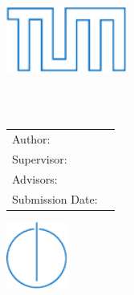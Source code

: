 \begin{titlepage}
  \centering

  \vspace{35mm}
  \includegraphics[width=40mm]{logos/tum}

  \vspace{5mm}
  {\huge\MakeUppercase{\getFaculty{}}}\\

  \vspace{5mm}
  {\large\MakeUppercase{\getUniversity{}}}\\

  \vspace{20mm}
  {\Large \getDoctype{}}

  \vspace{15mm}
  {\huge\bfseries \getTitle{}}

  \vspace{10mm}
  {\huge\bfseries \getTitleGer{}}

  \vspace{15mm}
  \begin{tabular}{l l}
    Author: & \getAuthor{} \\
    Supervisor: & \getSupervisor{} \\
    Advisors: & \getAdvisor{} \\
    Submission Date: & \getSubmissionDate{} \\
  \end{tabular}

  \vspace{15mm}
  \includegraphics[width=20mm]{logos/faculty}
\end{titlepage}
